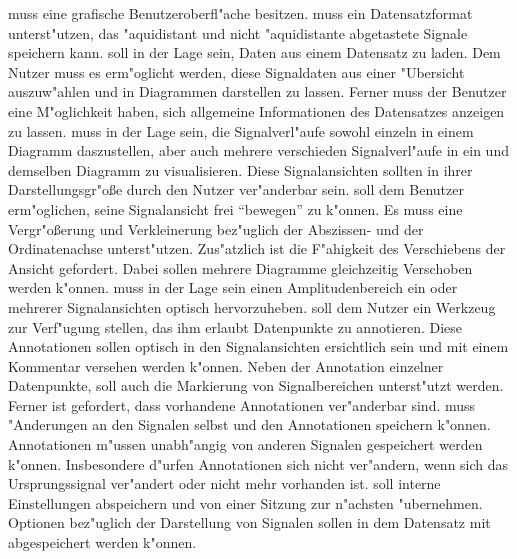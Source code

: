\begin{enumerate}
	 muss eine grafische Benutzeroberfl"ache besitzen.
	 muss ein Datensatzformat unterst"utzen, das "aquidistant und nicht "aquidistante abgetastete Signale speichern kann.
	 soll in der Lage sein, Daten aus einem Datensatz zu laden.
						 Dem Nutzer muss es erm"oglicht werden, diese Signaldaten aus einer "Ubersicht auszuw"ahlen und in Diagrammen darstellen zu lassen.
						 Ferner muss der Benutzer eine M"oglichkeit haben, sich allgemeine Informationen des Datensatzes anzeigen zu lassen.
	 muss in der Lage sein, die Signalverl"aufe sowohl einzeln in einem Diagramm daszustellen, aber auch mehrere verschieden Signalverl"aufe in ein und demselben Diagramm zu visualisieren.
				  Diese Signalansichten sollten in ihrer Darstellungsgr"o\ss e durch den Nutzer ver"anderbar sein.
	 soll dem Benutzer erm"oglichen, seine Signalansicht frei "`bewegen"' zu k"onnen.
				 Es muss eine Vergr"o\ss erung und Verkleinerung bez"uglich der Abszissen- und der Ordinatenachse unterst"utzen.
				 Zus"atzlich ist die F"ahigkeit des Verschiebens der Ansicht gefordert.
				 Dabei sollen mehrere Diagramme gleichzeitig Verschoben werden k"onnen.
	 muss in der Lage sein einen Amplitudenbereich ein oder mehrerer Signalansichten optisch hervorzuheben.
	 soll dem Nutzer ein Werkzeug zur Verf"ugung stellen, das ihm erlaubt Datenpunkte zu annotieren.
					  Diese Annotationen sollen optisch in den Signalansichten ersichtlich sein und mit einem Kommentar versehen werden k"onnen.
					  Neben der Annotation einzelner Datenpunkte, soll auch die Markierung von Signalbereichen unterst"utzt werden.
					  Ferner ist gefordert, dass vorhandene Annotationen ver"anderbar sind.
	 muss "Anderungen an den Signalen selbst und den Annotationen speichern k"onnen.
			Annotationen m"ussen unabh"angig von anderen Signalen gespeichert werden k"onnen.
			Insbesondere d"urfen Annotationen sich nicht ver"andern, wenn sich das Ursprungssignal ver"andert oder nicht mehr vorhanden ist.
	 soll interne Einstellungen abspeichern und von einer Sitzung zur n"achsten "ubernehmen.
					   Optionen bez"uglich der Darstellung von Signalen sollen in dem Datensatz mit abgespeichert werden k"onnen.
\end{enumerate}


